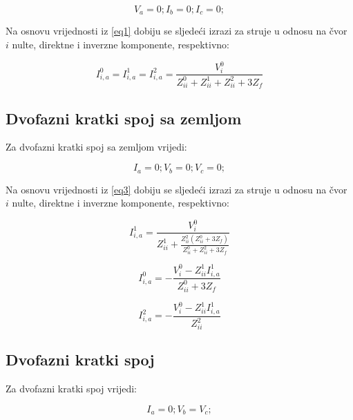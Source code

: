 \documentclass[a4paper, 12pt]{article}
\numberwithin{figure}{section}
\numberwithin{equation}{section}
\begin{document}
\begin{equation}
    V_{a} = 0;
    I_{b} = 0;
    I_{c} = 0;
    \label{eq1}
\end{equation}

Na osnovu vrijednosti iz \ref{eq1} dobiju se sljedeći izrazi za struje u odnosu na čvor $i$ nulte, direktne i inverzne komponente, respektivno:

\begin{equation} 
I^{0}_{i,a} = I^{1}_{i,a}  = I^{2}_{i,a} =\frac{V^{0}_{i}}{Z^{0}_{ii} + Z^{1}_{ii} + Z^{2}_{ii} + 3Z_{f}}
\label{eq2}
\end{equation}

\subsection{Dvofazni kratki spoj sa zemljom}

Za dvofazni kratki spoj sa zemljom \cite{b2} vrijedi:

\begin{equation}
    I_{a} = 0;
    V_{b} = 0;
    V_{c} = 0;
    \label{eq3}
\end{equation}

Na osnovu vrijednosti iz \ref{eq3} dobiju se sljedeći izrazi za struje u odnosu na čvor $i$ nulte, direktne i inverzne komponente, respektivno:

\begin{equation}
I^{1}_{i,a}  = \frac{V^{0}_{i}}{Z^{1}_{ii} + \frac{Z^{2}_{ii}(Z^{0}_{ii} + 3Z_{f})}{Z^{0}_{ii} + Z^{2}_{ii} + 3Z_{f}}}
    \label{eq4}
\end{equation}

\begin{equation}I^{0}_{i,a} = -\frac{V^{0}_{i} - Z^{1}_{ii}I^{1}_{i,a}}{Z^{0}_{ii} + 3Z_{f}}
    \label{eq5}
\end{equation}

\begin{equation}I^{2}_{i,a} =-\frac{V^{0}_{i} - Z^{1}_{ii}I^{1}_{i,a}}{Z^{2}_{ii}}
    \label{eq6}
\end{equation}

\subsection{Dvofazni kratki spoj}

Za dvofazni kratki spoj \cite{b2} vrijedi:

\begin{equation}
    I_{a} = 0;
    V_{b} = V_{c};
    \label{eq7}
\end{equation}
\end{document}
